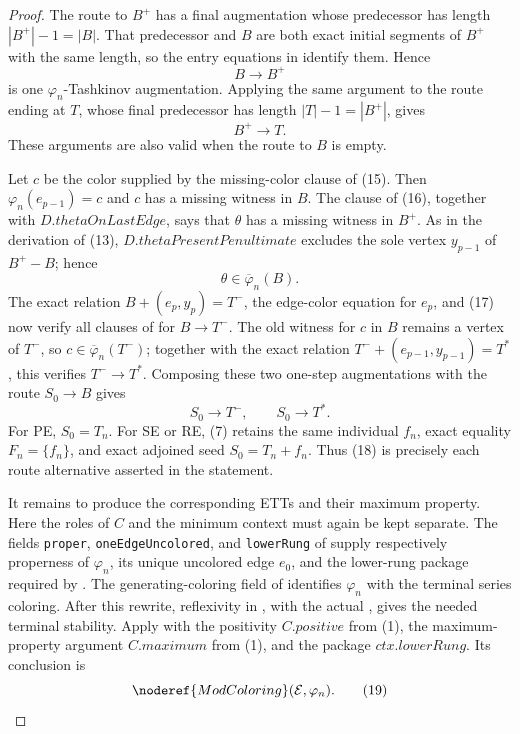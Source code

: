 \begin{proof}
The route to \(B^+\) has a final augmentation whose predecessor has
length \(|B^+|-1=|B|\).  That predecessor and \(B\) are both exact initial
segments of \(B^+\) with the same length, so the entry equations in
 identify them.  Hence
\[
                         B\longrightarrow B^+                \tag{15}
\]
is one \(\varphi_n\)-Tashkinov augmentation.  Applying the same argument
to the route ending at \(T\), whose final predecessor has length
\(|T|-1=|B^+|\), gives
\[
                         B^+\longrightarrow T.               \tag{16}
\]
These arguments are also valid when the route to \(B\) is empty.

Let \(c\) be the color supplied by the missing-color clause of (15).
Then \(\varphi_n(e_{p-1})=c\) and \(c\) has a missing witness in \(B\).
The clause of (16), together with
\(D.\mathit{thetaOnLastEdge}\), says that \(\theta\) has a missing
witness in \(B^+\).  As in the derivation of (13),
\(D.\mathit{thetaPresentPenultimate}\) excludes the sole vertex
\(y_{p-1}\) of \(B^+-B\); hence
\[
                    \theta\in\overline\varphi_n(B).          \tag{17}
\]
The exact relation \(B+(e_p,y_p)=T^-\), the edge-color equation for
\(e_p\), and (17) now verify all clauses of
 for \(B\longrightarrow T^-\).  The old
witness for \(c\) in \(B\) remains a vertex of \(T^-\), so
\(c\in\overline\varphi_n(T^-)\); together with the exact relation
\(T^-+(e_{p-1},y_{p-1})=T^*\), this verifies
\(T^-\longrightarrow T^*\).  Composing these two one-step augmentations
with the route \(S_0\longrightarrow B\) gives
\[
 S_0\longrightarrow T^-,\qquad S_0\longrightarrow T^*.       \tag{18}
\]
For PE, \(S_0=T_n\).  For SE or RE, (7) retains the same individual
\(f_n\), exact equality \(F_n=\{f_n\}\), and exact adjoined seed
\(S_0=T_n+f_n\).  Thus (18) is precisely each route alternative asserted
in the statement.

It remains to produce the corresponding ETTs and their maximum property.
Here the roles of \(C\) and the minimum context must again be kept
separate.  The fields \texttt{proper}, \texttt{oneEdgeUncolored}, and
\texttt{lowerRung} of
 supply respectively
properness of \(\varphi_n\), its unique uncolored edge \(e_0\), and the
lower-rung package required by .  The generating-coloring
field of  identifies \(\varphi_n\) with
the terminal series coloring.  After this rewrite, reflexivity in
, with the actual
, gives the needed terminal stability.
Apply  with the positivity \(C.\mathit{positive}\) from
(1), the maximum-property argument \(C.\mathit{maximum}\) from (1), and
the package \(\mathit{ctx.lowerRung}\).  Its conclusion is
\[
                     \noderef{ModColoring}(\mathcal E,\varphi_n). \tag{19}
\]


\end{proof}
